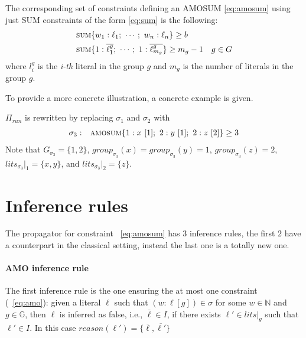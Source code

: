 The corresponding set of constraints defining an AMOSUM \eqref{eq:amosum} using just SUM constraints of the form \eqref{eq:sum}
is the following:
\begin{align*}
    & \textsc{sum}\{w_1 : \ell_1;\ \cdots;\ w_n : \ell_n\} \geq b\\
    & \textsc{sum}\{1 : \overline{\ell_{1}^g};\ \cdots;\ 1 : \overline{\ell_{m_{g}}^g}\} \geq m_{g} - 1 \quad g \in G
\end{align*}
where $l_{i}^g$ is the \textit{i-th} literal in the group $g$ and $m_{g}$ is the number of literals in the group $g$.

To provide a more concrete illustration,
a concrete example is given.
\begin{example}\label{ex:running-revised}
    $\Pi_{\mathit{run}}$ is rewritten by replacing $\sigma_1$ and $\sigma_2$ with
    \begin{align*}
    \begin{array}{rl}
        \sigma_{3}: & \textsc{amosum}\{
            1 : x\ [1];\ 2 : y\ [1];\ 2 : z\ [2]
        \} \geq 3
    \end{array}
    \end{align*}
    Note that $\mathit{G}_{\sigma_3}=\{1, 2\}$, 
    $\mathit{group}_{\sigma_{3}}(x) = \mathit{group}_{\sigma_{3}}(y) = 1$, 
    $\mathit{group}_{\sigma_{3}}(z) = 2$, 
    $\mathit{lits}_{\sigma_{3}}|_1 = \{x, y\}$, and
    $\mathit{lits}_{\sigma_{3}}|_2 = \{z\}$.
\end{example}
\section{Inference rules}
\label{sec:amo:inference_rules}
The propagator for constraint ~\ref{eq:amosum} has 3 inference rules,
the first 2 have a counterpart in the classical setting, instead the last
one is a totally new one.

\paragraph{AMO inference rule} 
\label{eq:amosum:propagation:1}
The first inference rule is the one ensuring the at most one constraint 
(~\ref{eq:amo}): given a literal 
$\ell$ such that $(w : \ell [g]) \in \sigma$ for some $w \in \mathbb{N}$ and $g \in \mathbb{G}$,
then $\ell$ is inferred as false, i.e., $\overline{\ell} \in I$, if there exists 
$\ell' \in \mathit{lits}|_g$ such that $\ell' \in I$. In this case
$\mathit{reason}(\ell')=\{\overline{\ell},\overline{\ell'}\}$

